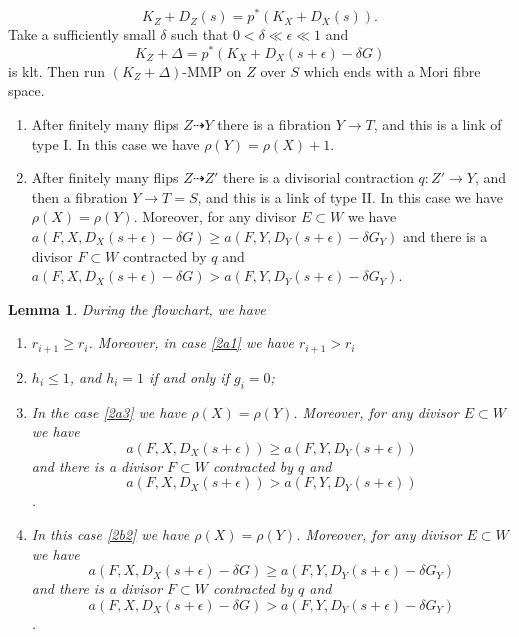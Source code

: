 \documentclass{article}
\newtheorem{lem}[defn]{Lemma}
\begin{document}
\begin{enumerate}[A]
    \[
      K_{Z}+D_{Z}(s)=p^*(K_{X}+D_{X}(s))
    .\]
   Take a sufficiently small $\delta$ such that $0<\delta \ll \epsilon \ll 1$ and
   \[
     K_{Z}+\Delta=p^*(K_{X}+D_{X}(s+\epsilon)-\delta G)
   \]
  is klt. Then run $(K_{Z}+\Delta)$-MMP on $Z$ over $S$ which ends with a Mori fibre space.
  \begin{enumerate}[1]
    \item\label{2b1} After finitely many flips $Z\dashrightarrow Y$ there is a fibration $Y\to T$, and this is a link of type I. In this case we have $\rho(Y)=\rho(X)+1$.
    \item\label{2b2} After finitely many flips $Z\dashrightarrow Z'$ there is a divisorial contraction $q:Z'\to Y$, and then a fibration $Y\to T=S$, and this is a link of type II. In this case we have $\rho(X)=\rho(Y)$. Moreover, for any divisor $E \subset  W$ we have $a(F,X,D_{X}(s+\epsilon)-\delta G)\geqslant a(F,Y,D_{Y}(s+\epsilon)-\delta G_{Y})$ and there is a divisor $F \subset W$ contracted by $q$ and $a(F,X,D_{X}(s+\epsilon)-\delta G)>a(F,Y,D_{Y}(s+\epsilon)-\delta G_{Y})$. 
  \end{enumerate}
\end{enumerate}
\begin{lem}\label{behavior2}
During the flowchart,  we have
\begin{enumerate}
  \item $r_{i+1}\geqslant r_{i}$. Moreover, in case \ref{2a1} we have $r_{i+1}>r_{i}$
  \item  $h_{i}\leqslant 1$, and $h_{i}=1$ if and only if $g_{i}=0$;
  \item   In the case \ref{2a3} we have $\rho(X)=\rho(Y)$. Moreover, for any divisor $E \subset  W$ we have
    \[
      a(F,X,D_{X}(s+\epsilon))\geqslant a(F,Y,D_{Y}(s+\epsilon))
    \]
    and there is a divisor $F \subset W$ contracted by $q$ and
    \[
      a(F,X,D_{X}(s+\epsilon))>a(F,Y,D_{Y}(s+\epsilon))
    \]
    . 
  \item  In this case \ref{2b2}  we have $\rho(X)=\rho(Y)$. Moreover, for any divisor $E \subset  W$ we have
    \[
      a(F,X,D_{X}(s+\epsilon)-\delta G)\geqslant a(F,Y,D_{Y}(s+\epsilon)-\delta G_{Y})
    \]
    and there is a divisor $F \subset W$ contracted by $q$ and
    \[
      a(F,X,D_{X}(s+\epsilon)-\delta G)>a(F,Y,D_{Y}(s+\epsilon)-\delta G_{Y})
    \]
    .
\end{enumerate}
\end{lem}
\end{document}
